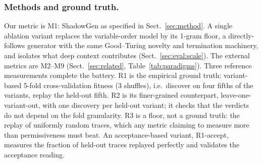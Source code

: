 \documentclass[runningheads]{llncs}
\begin{document}
\subsubsection{Methods and ground truth.}
Our metric is M1: ShadowGen as specified in Sect.~\ref{sec:method}. A single ablation variant replaces the variable-order model by its 1-gram floor, a directly-follows generator with the same Good--Turing novelty and termination machinery, and isolates what deep context contributes (Sect.~\ref{sec:eval:scale}). The external metrics are M2--M9 (Sect.~\ref{sec:related}, Table~\ref{tab:paradigms}). Three reference measurements complete the battery. R1 is the empirical ground truth: variant-based 5-fold cross-validation fitness ($3$ shuffles), i.e.\ discover on four fifths of the variants, replay the held-out fifth. R2 is its finer-grained counterpart, leave-one-variant-out, with one discovery per held-out variant; it checks that the verdicts do not depend on the fold granularity. R3 is a floor, not a ground truth: the replay of uniformly random traces, which any metric claiming to measure more than permissiveness must beat. An acceptance-based variant, R1-accept, measures the fraction of held-out traces replayed perfectly and validates the acceptance reading.
\end{document}
